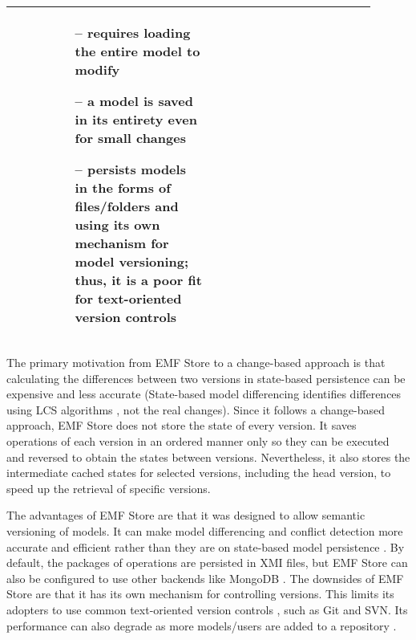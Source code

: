 \begin{table*}[]
\begin{scriptsize}
\begin{tabular}{
        |>{\centering\arraybackslash}m{0.1\linewidth}
        |>{\centering\arraybackslash}m{0.4\linewidth}
        |>{\centering\arraybackslash}m{0.4\linewidth}
        |}
      &
      \begin{minipage}[t]{\linewidth}
        \raggedright
        \vspace{-12pt}
        \begin{itemize}[leftmargin=7pt]
          \setlength
          \item[--] requires loading the entire model to modify
          \item[--] a model is saved in its entirety even for small changes
          \item[--] persists models in the forms of files/folders and using its own mechanism for model versioning; thus, it is a poor fit for text-oriented version controls
          \item[]
        \end{itemize}
      \end{minipage}
      \\
      \hline
    \end{tabular}
  \end{scriptsize}
\end{table*}

The primary motivation from EMF Store to a change-based approach is that calculating the differences between two versions in state-based persistence can be expensive and less accurate \cite{emfstore2019versioning} (State-based model differencing identifies differences using LCS algorithms \cite{emfcompare2018developer,DBLP:journals/algorithmica/Meyers86}, not the real changes). Since it follows a change-based approach, EMF Store does not store the state of every version. It saves operations of each version in an ordered manner only so they can be executed and reversed to obtain the states between versions. Nevertheless, it also stores the intermediate cached states for selected versions, including the head version, to speed up the retrieval of specific versions.

The advantages of EMF Store are that it was designed to allow semantic versioning of models. It can make model differencing and conflict detection more accurate and efficient rather than they are on state-based model persistence \cite{emfstore2019versioning}. By default, the packages of operations are persisted in XMI files, but EMF Store can also be configured to use other backends like MongoDB \cite{emfstore2019mongodb}. The downsides of EMF Store are that it has its own mechanism for controlling versions. This limits its adopters to use common text-oriented version controls \cite{emfstore2019getting}, such as Git and SVN. Its performance can also degrade as more models/users are added to a repository \cite{KolovosRMPGCLRV13}.

